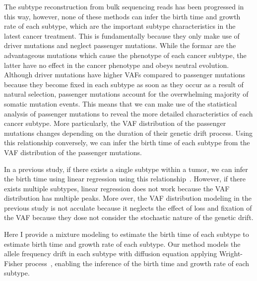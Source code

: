 \documentclass{article}
\begin{document}
The subtype reconstruction from bulk sequencing reads has been progressed in this way, however, none of these methods can infer the birth time and growth rate of each subtype, which are the important subtype characteristics in the latest cancer treatment.
This is fundamentally because they only make use of driver mutations and neglect passenger mutations.
While the formar are the advantageous mutations which cause the phenotype of each cancer subtype, the latter have no effect in the cancer phenotype and obeys neutral evolution.
Although driver mutations have higher VAFs compared to passenger mutations because they become fixed in each subtype as soon as they occur as a result of natural selection,
passenger mutations account for the overwhelming majority of somatic mutation events.
This means that we can make use of the statistical analysis of passenger mutations to reveal the more detailed characteristics of each cancer subtype.
More particularly, the VAF distribution of the passenger mutations changes depending on the duration of their genetic drift process.
Using this relationship conversely, we can infer the birth time of each subtype from the VAF distribution of the passenger mutations.


In a previous study, if there exists a single subtype within a tumor, we can infer the birth time using linear regression using this relationship~\cite{williams2016identification}.
However, if there exists multiple subtypes, linear regression does not work because the VAF distribution has multiple peaks.
More over, the VAF distribution modeling in the previous study is not acculate because it neglects the effect of loss and fixation of the VAF because they dose not consider the stochastic nature of the genetic drift.

Here I provide a mixture modeling to estimate the birth time of each subtype to estimate birth time and growth rate of each subtype.
Our method models the allele frequency drift in each subtype with diffusion equation applying Wright-Fisher process~\cite{wright1931evolution}, enabling the inference of the birth time and growth rate of each subtype.
\end{document}
